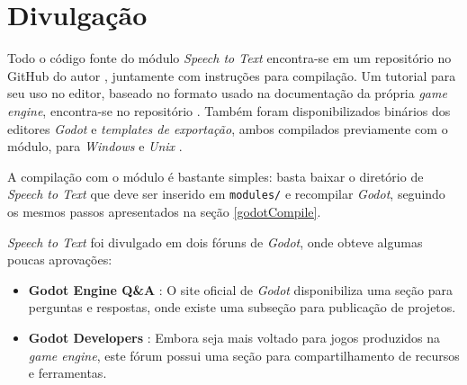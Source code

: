 
\section{Divulgação}
\label{modulePublishing}

Todo o código fonte do módulo \textit{Speech to Text} encontra-se em um repositório no GitHub do autor \citep{sttModuleGitHub}, juntamente com instruções para compilação. Um tutorial para seu uso no editor, baseado no formato usado na documentação da própria \textit{game engine}, encontra-se no repositório \citep{sttModuleTutorial}. Também foram disponibilizados binários dos editores \textit{Godot} e \textit{templates de exportação}, ambos compilados previamente com o módulo, para \textit{Windows} e \textit{Unix} \citep{sttModuleDownload}.

A compilação com o módulo é bastante simples: basta baixar o diretório de \textit{Speech to Text} que deve ser inserido em \texttt{modules/} e recompilar \textit{Godot}, seguindo os mesmos passos apresentados na seção \ref{godotCompile}.

\textit{Speech to Text} foi divulgado em dois fóruns de \textit{Godot}, onde obteve algumas poucas aprovações:

\begin{itemize}
\item \textbf{Godot Engine Q\&A} \citep{sttModuleGodotQA}: O site oficial de \textit{Godot} disponibiliza uma seção para perguntas e respostas, onde existe uma subseção para publicação de projetos.

\item \textbf{Godot Developers} \citep{sttModuleGodotDevelopers}: Embora seja mais voltado para jogos produzidos na \textit{game engine}, este fórum possui uma seção para compartilhamento de recursos e ferramentas.
\end{itemize}
